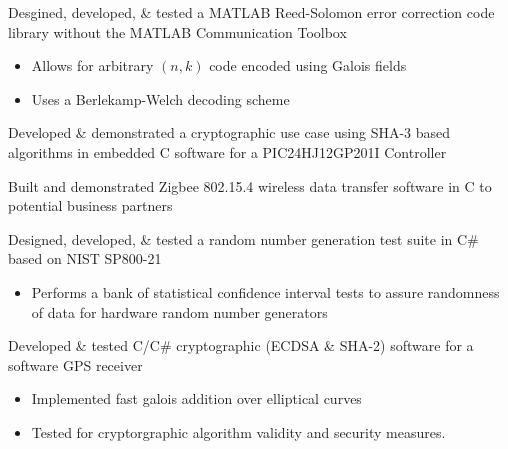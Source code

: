 \documentclass[letterpaper]{clinton-resume}
\begin{document}
\begin{minipage}[t]{0.66\textwidth}
\begin{tightitemize}
\item Desgined, developed, \& tested a MATLAB Reed-Solomon error correction code library without the MATLAB Communication Toolbox
	\begin{itemize}
	\item Allows for arbitrary $(n,k)$ code encoded using Galois fields
	\item Uses a Berlekamp-Welch decoding scheme
	\end{itemize}
\item Developed \& demonstrated a cryptographic use case using SHA-3 based algorithms in embedded C software for a PIC24HJ12GP201I Controller
\item Built and demonstrated Zigbee 802.15.4 wireless data transfer software in C to potential business partners
\item Designed, developed, \& tested a random number generation test suite in C\# based on NIST SP800-21
	\begin{itemize}
	\item Performs a bank of statistical confidence interval tests to assure randomness of data for hardware random number generators
	\end{itemize}
\item Developed \& tested C/C\# cryptographic (ECDSA \& SHA-2) software for a software GPS receiver 
\begin{itemize}
\item  Implemented fast galois addition over elliptical curves
\item Tested for cryptorgraphic algorithm validity and security measures.
\end{itemize}
\end{tightitemize}
\sectionspace %
\end{minipage}
\newpage%
\end{document}

